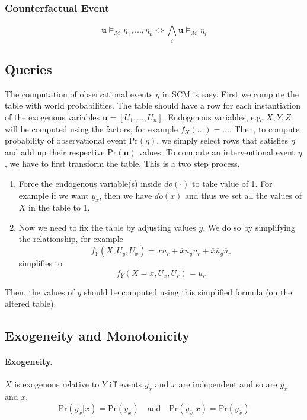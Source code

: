 \documentclass[11pt]{article}
\newcommand{\bu}{\mathbf{u}}
\newcommand{\pr}{\mathrm{Pr}}
\begin{document}
\subsubsection{Counterfactual Event}
\begin{equation}
	\bu \vDash_{\mathcal M} \eta_1, ..., \eta_n \iff \bigwedge_i \bu \vDash_{\mathcal M} \eta_i
\end{equation}

\subsection{Queries}
The computation of observational events $\eta$ in SCM is easy. First we compute the table with world probabilities. The table should have a row for each instantiation of the exogenous variables $\bu = [U_1, ..., U_n]$. Endogenous variables, e.g. $X, Y, Z$ will be computed using the factors, for example $f_X(...) = ...$. Then, to compute probability of observational event $\pr(\eta)$, we simply select rows that satisfies $\eta$ and add up their respective $\pr(\bu)$ values. To compute an interventional event $\eta$, we have to first transform the table. This is a two step process, 
\begin{enumerate}
	\item Force the endogenous variable(s) inside $do(\cdot)$ to take value of 1. For example if we want $y_x$, then we have $do(x)$ and thus we set all the values of $X$ in the table to 1. 
	\item Now we need to fix the table by adjusting values $y$. We do so by simplifying the relationship, for example
	\begin{equation}
		f_Y(X, U_y, U_x) = xu_r + \overbar x u_y u_r + \overbar x \overbar u _y \overbar u_r
	\end{equation}
	simplifies to 
	\begin{equation}
		f_Y(X = x, U_x, U_r) = u_r
	\end{equation}
\end{enumerate}
Then, the values of $y$ should be computed using this simplified formula (on the altered table). 

\subsection{Exogeneity and Monotonicity}
\paragraph{Exogeneity.} $X$ is exogenous relative to $Y$ iff events $y_x$ and $x$ are independent and so are $y_{\overbar x}$ and $x$,
\begin{equation}
	\pr (y_x | x) = \pr (y_x) \quad \text{and} \quad \pr (y_{\overbar x}| x) = \pr ( y_{\overbar x}) 
\end{equation}
\end{document}
